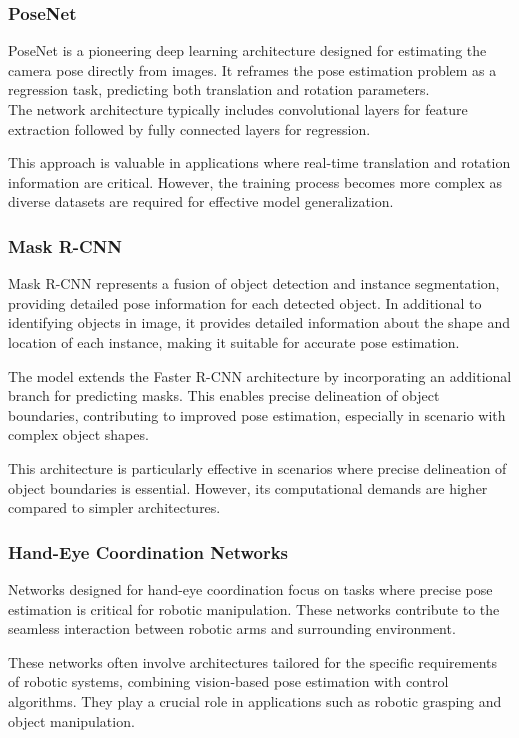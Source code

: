 \subsubsection{PoseNet}
PoseNet \cite{PosNet} is a pioneering deep learning architecture designed for estimating the camera pose directly from images. It reframes the pose estimation problem as a regression task, predicting both translation and rotation parameters.\\
The network architecture typically includes convolutional layers for feature extraction followed by fully connected layers for regression.

This approach is valuable in applications where real-time translation and rotation information are critical. However, the training process becomes more complex as diverse datasets are required for effective model generalization.

\subsubsection{Mask R-CNN}
Mask R-CNN \cite{MaskRCNN} represents a fusion of object detection and instance segmentation, providing detailed pose information for each detected object.
In additional to identifying objects in image, it provides detailed information about the shape and location of each instance, making it suitable for accurate pose estimation.

The model extends the Faster R-CNN architecture by incorporating an additional branch for predicting masks. This enables precise delineation of object boundaries, contributing to improved pose estimation, especially in scenario with complex object shapes.

This architecture is particularly effective in scenarios where precise delineation of object boundaries is essential. However, its computational demands are higher compared to simpler architectures.

\subsubsection{Hand-Eye Coordination Networks}
Networks designed for hand-eye coordination focus on tasks where precise pose estimation is critical for robotic manipulation. These networks contribute to the seamless interaction between robotic arms and surrounding environment.

These networks often involve architectures tailored for the specific requirements of robotic systems, combining vision-based pose estimation with control algorithms. They play a crucial role in applications such as robotic grasping and object manipulation.

